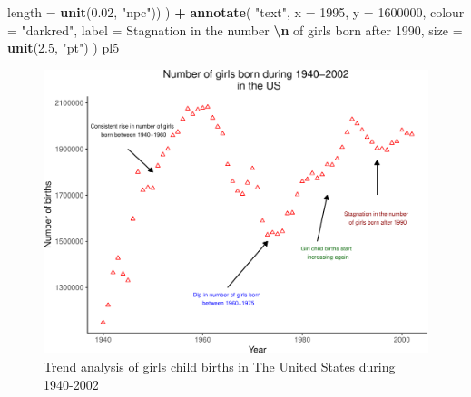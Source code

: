 \documentclass[11pt,a4paper,]{article}
\newenvironment{Shaded}{\begin{snugshade}}{\end{snugshade}}
\newcommand{\AttributeTok}[1]{\textcolor[rgb]{0.13,0.29,0.53}{#1}}
\newcommand{\DecValTok}[1]{\textcolor[rgb]{0.00,0.00,0.81}{#1}}
\newcommand{\FloatTok}[1]{\textcolor[rgb]{0.00,0.00,0.81}{#1}}
\newcommand{\FunctionTok}[1]{\textcolor[rgb]{0.13,0.29,0.53}{\textbf{#1}}}
\newcommand{\NormalTok}[1]{#1}
\newcommand{\SpecialCharTok}[1]{\textcolor[rgb]{0.81,0.36,0.00}{\textbf{#1}}}
\newcommand{\StringTok}[1]{\textcolor[rgb]{0.31,0.60,0.02}{#1}}
\begin{document}
\begin{Shaded}
\begin{Highlighting}[]
                  \AttributeTok{length =} \FunctionTok{unit}\NormalTok{(}\FloatTok{0.02}\NormalTok{, }\StringTok{"npc"}\NormalTok{))}
\NormalTok{  ) }\SpecialCharTok{+}
  \FunctionTok{annotate}\NormalTok{(}
    \StringTok{"text"}\NormalTok{,}
    \AttributeTok{x =} \DecValTok{1995}\NormalTok{,}
    \AttributeTok{y =} \DecValTok{1600000}\NormalTok{,}
    \AttributeTok{colour =} \StringTok{"darkred"}\NormalTok{,}
    \AttributeTok{label =} \StringTok{\textquotesingle{}Stagnation in the number }\SpecialCharTok{\textbackslash{}n}\StringTok{ of girls born after 1990\textquotesingle{}}\NormalTok{,}
    \AttributeTok{size =} \FunctionTok{unit}\NormalTok{(}\FloatTok{2.5}\NormalTok{, }\StringTok{"pt"}\NormalTok{)}
\NormalTok{  )  }
\NormalTok{pl5}
\end{Highlighting}
\end{Shaded}

\begin{figure}

\includegraphics{Arindom_Baruah_32779267_files/figure-latex/pres-1} \hfill{}

\caption{Trend analysis of girls child births in The United States during 1940-2002}\label{fig:pres}
\end{figure}

\printbibliography
\end{document}
